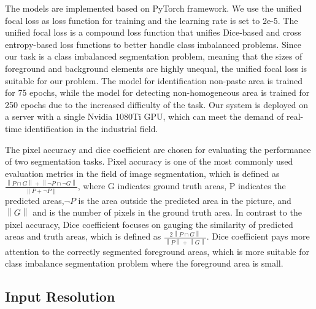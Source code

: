 \documentclass[pdflatex,sn-mathphys]{sn-jnl}%
\theoremstyle{thmstyleone}%
\theoremstyle{thmstyletwo}%
\theoremstyle{thmstylethree}%
\begin{document}
The models are implemented based on PyTorch framework. 
We use the unified focal loss \cite{YEUNG2022102026} as loss function for training and the learning rate is set to 2e-5. 
The unified focal loss is a compound loss function that unifies Dice-based and cross entropy-based loss functions to better handle class imbalanced problems\cite{MA2022204}. 
Since our task is a class imbalanced segmentation problem, meaning that the sizes of foreground and background elements are highly unequal, the unified focal loss is suitable for our problem. 
The model for identification non-paste area is trained for 75 epochs, while the model for detecting non-homogeneous area is trained for 250 epochs due to the increased difficulty of the task. 
Our system is deployed on a server with a single Nvidia 1080Ti GPU, which can meet the demand of real-time identification in the industrial field.         


The pixel accuracy and dice coefficient are chosen for evaluating the performance of two segmentation tasks. 
Pixel accuracy is one of the most commonly used evaluation metrics in the field of image segmentation, which is defined as$ \frac{\left\|  P\cap G \right\| + \left\| \neg P\cap \neg G \right\| }{\left\| P+\neg P \right\| }$, where G indicates ground truth areas, P indicates the predicted areas,$\neg P$ is the area outside the predicted area in the picture, and $\left\|G\right\|$ and is the number of pixels in the ground truth area\cite{long2015fully}. 
In contrast to the pixel accuracy, Dice coefficient focuses on gauging the similarity of predicted areas and truth areas, which is defined as $\frac{2\left\|P\cap G\right\|}{\left\|P\right\| + \left\|G\right\|}$.
Dice coefficient pays more attention to the correctly segmented foreground areas, which is more suitable for class imbalance segmentation problem where the foreground area is small.



\subsection{Input Resolution}
\end{document}
